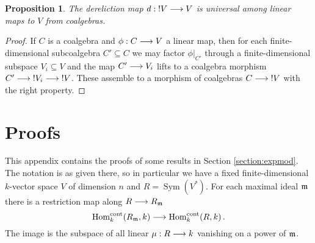 \documentclass[english,letter paper,12pt,reqno]{article}
\newtheorem{proposition}[theorem]{Proposition}
\theoremstyle{example}
\numberwithin{equation}{section}
\def\Hom{\operatorname{Hom}}
\DeclareMathOperator{\Sym}{Sym}
\begin{document}
\begin{proposition}\label{prop:infinite_v_lifting} The dereliction map $d: {!}V \longrightarrow V$ is universal among linear maps to $V$ from coalgebras.
\end{proposition}
\begin{proof}
If $C$ is a coalgebra and $\phi: C \longrightarrow V$ a linear map, then for each finite-dimensional subcoalgebra $C' \subseteq C$ we may factor $\phi|_{C'}$ through a finite-dimensional subspace $V_i \subseteq V$ and the map $C' \longrightarrow V_i$ lifts to a coalgebra morphism $C' \longrightarrow {!} V_i \longrightarrow {!} V$. These assemble to a morphism of coalgebras $C \longrightarrow {!} V$ with the right property.
\end{proof}

\appendix

\section{Proofs}\label{appendix:proofs}

This appendix contains the proofs of some results in Section \ref{section:expmod}. The notation is as given there, so in particular we have a fixed finite-dimensional $k$-vector space $V$ of dimension $n$ and $R = \Sym(V^*)$. For each maximal ideal $\mathfrak{m}$ there is a restriction map along $R \longrightarrow R_{\mathfrak{m}}$ 
\begin{equation}\label{eq:restrict_map_cont}
\Hom_k^{\cont}(R_{\mf{m}},k) \lto \Hom_k^{\cont}(R,k)\,.
\end{equation}
The image is the subspace of all linear $\mu: R \longrightarrow k$ vanishing on a power of $\mathfrak{m}$.
\end{document}
